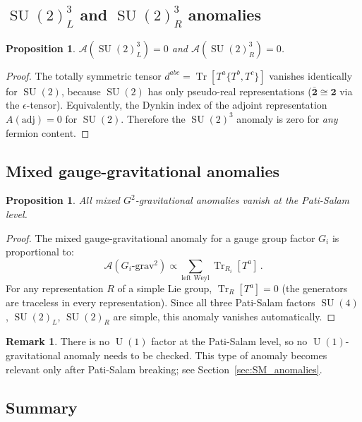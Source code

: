 \documentclass[12pt,a4paper]{article}
\newtheorem{proposition}[theorem]{Proposition}
\theoremstyle{definition}
\newtheorem{remark}[theorem]{Remark}
\newcommand{\Tr}{\operatorname{Tr}}
\newcommand{\SU}{\operatorname{SU}}
\newcommand{\U}{\operatorname{U}}
\begin{document}
\subsection{$\SU(2)_L^3$ and $\SU(2)_R^3$ anomalies}

\begin{proposition}
\label{prop:su2_anomaly}
$\mathcal{A}(\SU(2)_L^3) = 0$ and $\mathcal{A}(\SU(2)_R^3) = 0$.
\end{proposition}

\begin{proof}
The totally symmetric tensor $d^{abc} = \Tr[T^a \{T^b, T^c\}]$ vanishes identically for $\SU(2)$, because $\SU(2)$ has only pseudo-real representations ($\bar{\mathbf{2}} \cong \mathbf{2}$ via the $\epsilon$-tensor).
Equivalently, the Dynkin index of the adjoint representation $A(\mathrm{adj}) = 0$ for $\SU(2)$.
Therefore the $\SU(2)^3$ anomaly is zero for \emph{any} fermion content.
\end{proof}

\subsection{Mixed gauge-gravitational anomalies}

\begin{proposition}
\label{prop:mixed_grav}
All mixed $G^2$-gravitational anomalies vanish at the Pati-Salam level.
\end{proposition}

\begin{proof}
The mixed gauge-gravitational anomaly for a gauge group factor $G_i$ is proportional to:
\begin{equation}
\mathcal{A}(G_i\text{-grav}^2) \propto \sum_{\text{left Weyl}} \Tr_{R_i}[T^a]\,.
\end{equation}
For any representation $R$ of a simple Lie group, $\Tr_R[T^a] = 0$ (the generators are traceless in every representation).
Since all three Pati-Salam factors $\SU(4)$, $\SU(2)_L$, $\SU(2)_R$ are simple, this anomaly vanishes automatically.
\end{proof}

\begin{remark}
There is no $\U(1)$ factor at the Pati-Salam level, so no $\U(1)$-gravitational anomaly needs to be checked.
This type of anomaly becomes relevant only after Pati-Salam breaking; see Section~\ref{sec:SM_anomalies}.
\end{remark}

\subsection{Summary}
\end{document}
